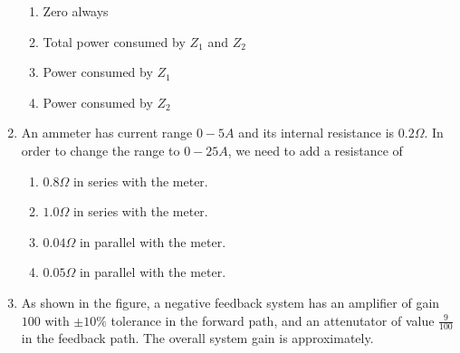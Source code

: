 \documentclass[journal]{IEEEtran}
\begin{document}
\begin{enumerate}
{\begin{figure}[H]
\label{fig:my_label}
\end{figure}
\begin{multicols}{2}
\begin{enumerate}
\item Zero always
\item Total power consumed by $Z_1$ and $Z_2$
\item Power consumed by $Z_1$
\item Power consumed by $Z_2$
\end{enumerate}
\end{multicols}
}
\item{
An ammeter has current range $0-5A$ and its internal resistance is $0.2\Omega$. In order to change the range to $0-25A$, we need to add a resistance of
\begin{multicols}{2}
\begin{enumerate}
\item $0.8\Omega$ in series with the meter.
\item $1.0\Omega$ in series with the meter.
\item $0.04\Omega$ in parallel with the meter.
\item $0.05\Omega$ in parallel with the meter.
\end{enumerate}
\end{multicols}
}
\item{
As shown in the figure, a negative feedback system has an amplifier of gain $100$ with $\pm 10\%$ tolerance in the forward path, and an attenutator of value $\frac{9}{100}$ in the feedback path. The overall system gain is approximately.
\begin{figure}[H]
\centering
{}%


\end{figure}}
\end{enumerate}
\end{document}
